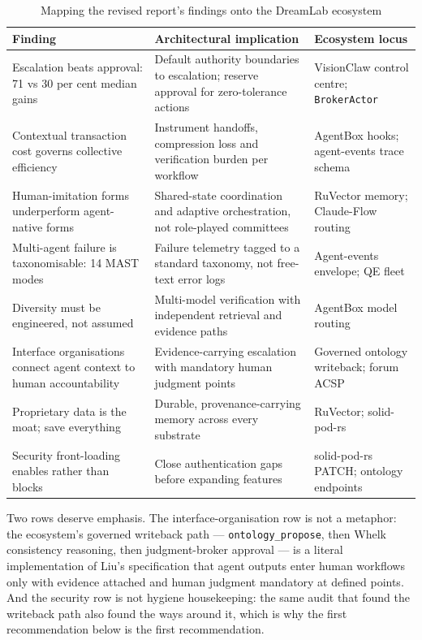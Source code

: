 \begin{table}[h]
\centering
\caption{Mapping the revised report's findings onto the DreamLab ecosystem}
\label{tab:findings-fit}
\begin{tabularx}{\textwidth}{L{4.6cm} X L{3.6cm}}
\toprule
\textbf{Finding} & \textbf{Architectural implication} & \textbf{Ecosystem locus} \\
\midrule
Escalation beats approval: 71 vs 30 per cent median gains \parencite{Pereira2026Playbook} & Default authority boundaries to escalation; reserve approval for zero-tolerance actions & VisionClaw control centre; \texttt{BrokerActor} \\
\addlinespace
Contextual transaction cost governs collective efficiency \parencite{Liu2026} & Instrument handoffs, compression loss and verification burden per workflow & AgentBox hooks; agent-events trace schema \\
\addlinespace
Human-imitation forms underperform agent-native forms \parencite{Liu2026} & Shared-state coordination and adaptive orchestration, not role-played committees & RuVector memory; Claude-Flow routing \\
\addlinespace
Multi-agent failure is taxonomisable: 14 MAST modes \parencite{Cemri2025} & Failure telemetry tagged to a standard taxonomy, not free-text error logs & Agent-events envelope; QE fleet \\
\addlinespace
Diversity must be engineered, not assumed \parencite{Liu2026} & Multi-model verification with independent retrieval and evidence paths & AgentBox model routing \\
\addlinespace
Interface organisations connect agent context to human accountability \parencite{Liu2026} & Evidence-carrying escalation with mandatory human judgment points & Governed ontology writeback; forum ACSP \\
\addlinespace
Proprietary data is the moat; save everything \parencite{Pereira2026Playbook} & Durable, provenance-carrying memory across every substrate & RuVector; solid-pod-rs \\
\addlinespace
Security front-loading enables rather than blocks \parencite{Pereira2026Playbook} & Close authentication gaps before expanding features & solid-pod-rs PATCH; ontology endpoints \\
\bottomrule
\end{tabularx}
\end{table}

Two rows deserve emphasis. The interface-organisation row is not a metaphor: the ecosystem's governed writeback path --- \texttt{ontology\_propose}, then Whelk consistency reasoning, then judgment-broker approval --- is a literal implementation of Liu's specification that agent outputs enter human workflows only with evidence attached and human judgment mandatory at defined points. And the security row is not hygiene housekeeping: the same audit that found the writeback path also found the ways around it, which is why the first recommendation below is the first recommendation.

